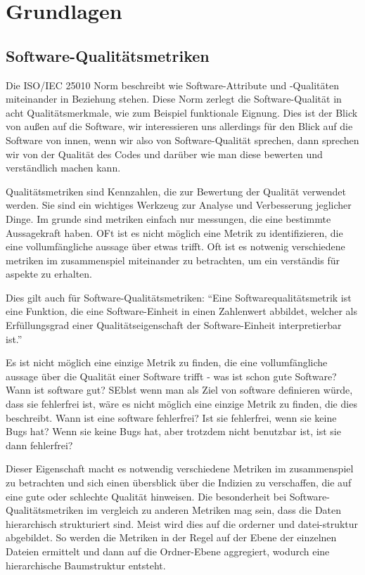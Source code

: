 \section{Grundlagen} \label{sec:Grundlagen}

\subsection{Software-Qualitätsmetriken} \label{sec:SoftwareQualitaetsmetriken}
Die ISO/IEC 25010 Norm \cite{iso25010_2024} beschreibt wie Software-Attribute und -Qualitäten miteinander in Beziehung stehen. Diese Norm zerlegt die Software-Qualität in acht Qualitätsmerkmale, wie zum Beispiel funktionale Eignung. Dies ist der Blick von außen auf die Software, wir interessieren uns allerdings für den Blick auf die Software von innen, wenn wir also von Software-Qualität sprechen, dann sprechen wir von der Qualität des Codes und darüber wie man diese bewerten und verständlich machen kann. 

Qualitätsmetriken sind Kennzahlen, die zur Bewertung der Qualität verwendet werden. Sie sind ein wichtiges Werkzeug zur Analyse und Verbesserung jeglicher Dinge. Im grunde sind metriken einfach nur messungen, die eine bestimmte Aussagekraft haben. OFt ist es nicht möglich eine Metrik zu identifizieren, die eine vollumfängliche aussage über etwas trifft. Oft ist es notwenig verschiedene metriken im zusammenspiel miteinander zu betrachten, um ein verständis für aspekte zu erhalten. 

Dies gilt auch für Software-Qualitätsmetriken: \enquote{Eine Softwarequalitätsmetrik ist eine Funktion, die eine Software-Einheit in einen Zahlenwert abbildet, welcher als Erfüllungsgrad einer Qualitätseigenschaft der Software-Einheit interpretierbar ist.}\cite{def_qual_metric}

Es ist nicht möglich eine einzige Metrik zu finden, die eine vollumfängliche aussage über die Qualität einer Software trifft - was ist schon gute Software? Wann ist software gut? SEblst wenn man als Ziel von software definieren würde, dass sie fehlerfrei ist, wäre es nicht möglich eine einzige Metrik zu finden, die dies beschreibt. Wann ist eine software fehlerfrei? Ist sie fehlerfrei, wenn sie keine Bugs hat? Wenn sie keine Bugs hat, aber trotzdem nicht benutzbar ist, ist sie dann fehlerfrei?

Dieser Eigenschaft macht es notwendig verschiedene Metriken im zusammenspiel zu betrachten und sich einen übersblick über die Indizien zu verschaffen, die auf eine gute oder schlechte Qualität hinweisen.
Die besonderheit bei Software-Qualitätsmetriken im vergleich zu anderen Metriken mag sein, dass die Daten hierarchisch strukturiert sind. Meist wird dies auf die orderner und datei-struktur abgebildet. So werden die Metriken in der Regel auf der Ebene der einzelnen Dateien ermittelt und dann auf die Ordner-Ebene aggregiert, wodurch eine hierarchische Baumstruktur entsteht. 


